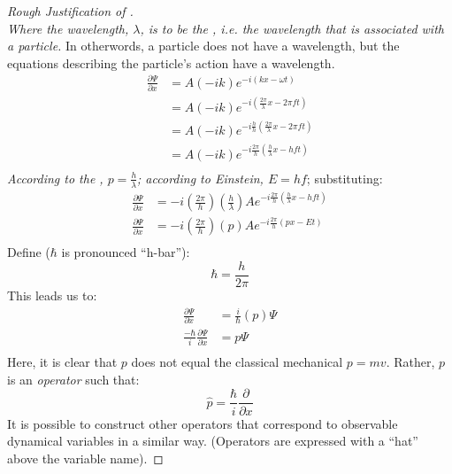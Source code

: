 \begin{proof}[Rough Justification of ]
\begin{equation*}
		\end{equation*}
		\emph{Where the wavelength, $\lambda$, is to be the , i.e. the wavelength that is associated with a particle.}
		In otherwords, a particle does not have a wavelength, but the equations describing the particle's action have a wavelength.
		\begin{align*}
			\frac{\partial \Psi}{\partial x} &= A \left( -ik \right) e^{-i \left( kx-\omega t \right)} \\
			&= A \left( -ik \right) e^{-i \left( \frac{2\pi}{\lambda}x- 2\pi ft \right)} \\
			&= A \left( -ik \right) e^{-i \frac{h}{h} \left( \frac{2\pi}{\lambda}x- 2\pi ft \right)} \\
			&= A \left( -ik \right) e^{-i \frac{2\pi}{h} \left( \frac{h}{\lambda}x- hft \right)} \\
		\end{align*}
		\emph{According to the , $p = \frac{h}{\lambda}$; according to Einstein, $E = hf$}; substituting:
		\begin{align*}
			\frac{\partial \Psi}{\partial x} &= -i \left( \frac{2 \pi}{h} \right) \left( \frac{h}{\lambda} \right) A e^{-i \frac{2\pi}{h} \left( \frac{h}{\lambda}x- hft \right)} \\ 
			\frac{\partial \Psi}{\partial x} &= -i \left( \frac{2 \pi}{h} \right) \left( p \right) A e^{-i \frac{2\pi}{h} \left( px- Et \right)} \\
		\end{align*}
		Define ($\hbar$ is pronounced ``h-bar''):
		\begin{equation} \label{eq:hbar Definition}
			\hbar = \frac{h}{2 \pi}
		\end{equation}
		This leads us to:
		\begin{align*}
			\frac{\partial \Psi}{\partial x} &= \frac{i}{\hbar} \left( p \right) \Psi \\
			\frac{-\hbar}{i} \frac{\partial \Psi}{\partial x} &= p \Psi \\
		\end{align*}
		Here, it is clear that $p$ does not equal the classical mechanical $p = mv$. Rather, $p$ is an \emph{operator} such that:
		\begin{equation*}
			\hat{p} = \frac{\hbar}{i} \frac{\partial}{\partial x}
		\end{equation*}
		It is possible to construct other operators that correspond to observable dynamical variables in a similar way. (Operators are expressed with a ``hat'' above the variable name). \newline

\end{proof}
